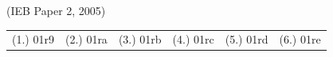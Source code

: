 \begin{eocexercises}{}
\begin{enumerate}
(IEB Paper 2, 2005) 

\end{enumerate}
\par \practiceinfo
\par \begin{tabular}[h]{cccccc}
(1.)	01r9	&
(2.)	01ra	&
(3.)	01rb	&
(4.)	01rc	&
(5.)	01rd	&
(6.)	01re	\\ %
\end{tabular}
\end{eocexercises}





